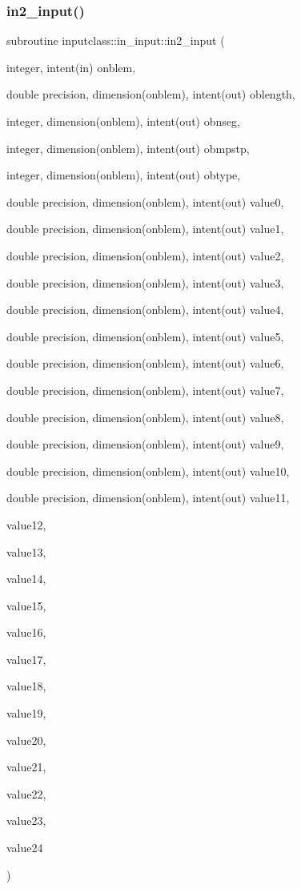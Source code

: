 \subsubsection{\texorpdfstring{in2\_input()}{in2\_input()}}
{\footnotesize\ttfamily subroutine inputclass\+::in\+\_\+input\+::in2\+\_\+input (\begin{DoxyParamCaption}\item[{integer, intent(in)}]{onblem,  }\item[{double precision, dimension(onblem), intent(out)}]{oblength,  }\item[{integer, dimension(onblem), intent(out)}]{obnseg,  }\item[{integer, dimension(onblem), intent(out)}]{obmpstp,  }\item[{integer, dimension(onblem), intent(out)}]{obtype,  }\item[{double precision, dimension(onblem), intent(out)}]{value0,  }\item[{double precision, dimension(onblem), intent(out)}]{value1,  }\item[{double precision, dimension(onblem), intent(out)}]{value2,  }\item[{double precision, dimension(onblem), intent(out)}]{value3,  }\item[{double precision, dimension(onblem), intent(out)}]{value4,  }\item[{double precision, dimension(onblem), intent(out)}]{value5,  }\item[{double precision, dimension(onblem), intent(out)}]{value6,  }\item[{double precision, dimension(onblem), intent(out)}]{value7,  }\item[{double precision, dimension(onblem), intent(out)}]{value8,  }\item[{double precision, dimension(onblem), intent(out)}]{value9,  }\item[{double precision, dimension(onblem), intent(out)}]{value10,  }\item[{double precision, dimension(onblem), intent(out)}]{value11,  }\item[{}]{value12,  }\item[{}]{value13,  }\item[{}]{value14,  }\item[{}]{value15,  }\item[{}]{value16,  }\item[{}]{value17,  }\item[{}]{value18,  }\item[{}]{value19,  }\item[{}]{value20,  }\item[{}]{value21,  }\item[{}]{value22,  }\item[{}]{value23,  }\item[{}]{value24 }\end{DoxyParamCaption})}



